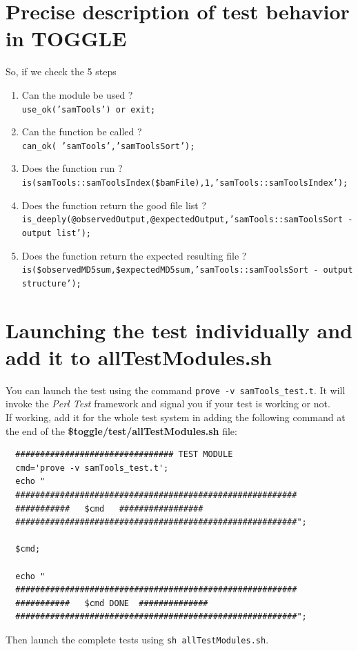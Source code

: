 \documentclass[a4paper,10pt]{report}
\begin{document}
\section{Precise description of test behavior in TOGGLE}

So, if we check the 5 steps

\begin{enumerate}
 \item Can the module be used ? \\
      \texttt{use\_ok('samTools') or exit;}
 \item Can the function be called ? \\
      \texttt{can\_ok( 'samTools','samToolsSort');}
 \item Does the function run ? \\
      \texttt{is(samTools::samToolsIndex(\$bamFile),1,'samTools::samToolsIndex');}
 \item Does the function return the good file list ?\\
      \texttt{is\_deeply(@observedOutput,@expectedOutput,'samTools::samToolsSort - output list');}
 \item Does the function return the expected resulting file ?
      \texttt{is(\$observedMD5sum,\$expectedMD5sum,'samTools::samToolsSort - output structure');}
\end{enumerate}

\section{Launching the test individually and add it to allTestModules.sh}

You can launch the test using the command \texttt{prove -v samTools\_test.t}. It will invoke the \textit{Perl Test} framework and signal you if your test is working or not. \\

If working, add it for the whole test system in adding the following command at the end of the \textbf{\$toggle/test/allTestModules.sh} file:

\begin{lstlisting}
  ################################ TEST MODULE
  cmd='prove -v samTools_test.t';
  echo "
  #########################################################
  ###########   $cmd   #################
  #########################################################";

  $cmd;

  echo " 
  ######################################################### 
  ###########   $cmd DONE  ##############  
  #########################################################";  

\end{lstlisting}
Then launch the complete tests using \texttt{sh allTestModules.sh}.
\end{document}
